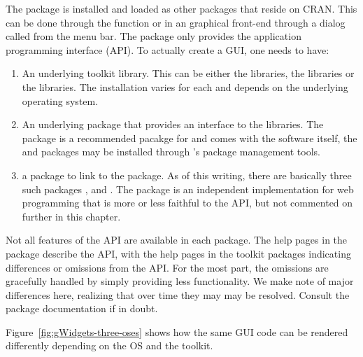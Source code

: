 The  package is installed and loaded as other \R\/
packages that reside on CRAN. This can be done through the function
 or in an \R\/ graphical front-end through a
dialog called from the menu bar. The  package only provides
the application programming interface (API). To actually create a GUI, one
needs to have: 
\begin{enumerate}
\item An underlying toolkit library. This can be either the \Tk\/
  libraries, the \Qt\/ libraries or the \GTK\/ libraries. The
  installation varies for each and depends on the underlying operating system.
  
\item An underlying \R\/
package that provides an interface to the libraries. The 
package is a recommended pacakge for \R\/ and comes with the \R\/
software itself, the  and  packages may be installed
through \R's package management tools.
\item a  package to link  to the \R\/
  package. As of this writing, there are basically three such packages
  ,  and .  The
   package is an independent implementation for web
  programming that is more or less faithful to the API, but not
  commented on further in this chapter.

\end{enumerate}

Not all features of the API are available in each package.  The help
pages in the  package describe the API, with the help pages in the
toolkit packages indicating differences or omissions from the API. For
the most part, the omissions are gracefully handled by simply
providing less functionality. We make note of major differences here,
realizing that over time they may may be resolved. Consult the package
documentation if in doubt.

Figure~\ref{fig:gWidgets-three-oses} shows how the same GUI code
can be rendered differently depending on the OS and the
toolkit. 



